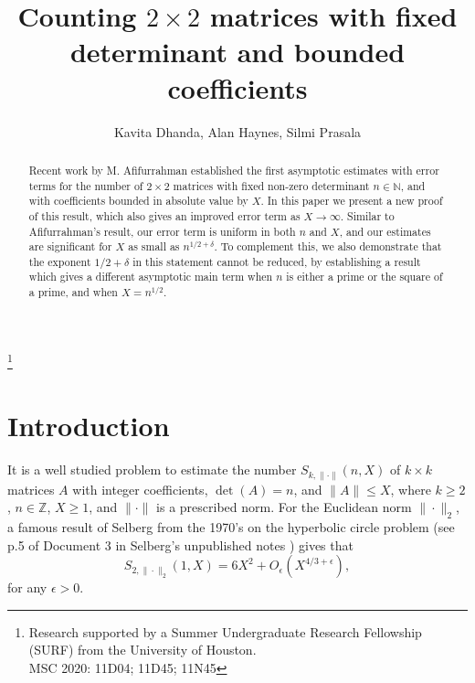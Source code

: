 \documentclass[reqno]{amsart}
\newcommand{\Z}{\mathbb{Z}}
\begin{document}
	
	\title[Matrices with fixed determinant and bounded coefficients]{Counting $2\times 2$ matrices with fixed determinant and bounded coefficients}
	
	\author{Kavita Dhanda, Alan Haynes, Silmi Prasala}
	

	\thanks{Research supported by a Summer Undergraduate Research Fellowship (SURF) from the University of Houston.\\
		\phantom{A..}MSC 2020: 11D04; 11D45; 11N45}
	
	
	
	\begin{abstract}
	Recent work by M. Afifurrahman established the first asymptotic estimates with error terms for the number of $2\times 2$ matrices with fixed non-zero determinant $n\in\mathbb{N}$, and with coefficients bounded in absolute value by $X$. In this paper we present a new proof of this result, which also gives an improved error term as $X\rightarrow\infty$. Similar to Afifurrahman's result, our error term is uniform in both $n$ and $X$, and our estimates are significant for $X$ as small as $n^{1/2+\delta}$. To complement this, we also demonstrate that the exponent $1/2+\delta$ in this statement cannot be reduced, by establishing a result which gives a different asymptotic main term when $n$ is either a prime or the square of a prime, and when $X=n^{1/2}$.
	\end{abstract}
	
	\maketitle
	
		
	
\section{Introduction}\label{sec.Intro}
It is a well studied problem to estimate the number $S_{k,\|\cdot\|}(n,X)$ of $k\times k$ matrices $A$ with integer coefficients, $\det(A)=n$, and $\|A\|\le X$, where $k\ge 2$, $n\in\Z$, $X\ge 1$, and $\|\cdot\|$ is a prescribed norm. For the Euclidean norm $\|\cdot\|_2$, a famous result of Selberg from the 1970's on the hyperbolic circle problem (see p.5 of Document 3 in Selberg's unpublished notes \cite{Selb1970}) gives that
\begin{equation*}
	S_{2,\|\cdot\|_2}(1,X)=6X^2+O_\epsilon\left(X^{4/3+\epsilon}\right),
\end{equation*}
for any $\epsilon>0$.
\end{document}
